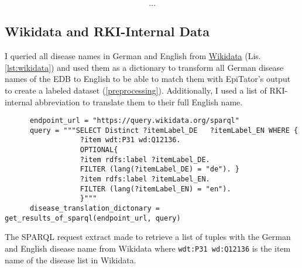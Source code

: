   \[\dots\]



\subsection{Wikidata and RKI-Internal Data}\label{wikidata}
  I queried all disease names in German and English from \href{https://www.wikidata.org/wiki/Wikidata:Main_Page}{Wikidata} (Lis. \ref{lst:wikidata}) and used them as a dictionary to transform all German disease names of the EDB to English to be able to match them with EpiTator's output to create a labeled dataset (\ref{preprocessing}).
  Additionally, I used a list of RKI-internal abbreviation to translate them to their full English name.

  \begin{listing}[h]
    \begin{verbatim}
      endpoint_url = "https://query.wikidata.org/sparql"
      query = """SELECT Distinct ?itemLabel_DE   ?itemLabel_EN WHERE {
                  ?item wdt:P31 wd:Q12136.
                  OPTIONAL{
                  ?item rdfs:label ?itemLabel_DE.
                  FILTER (lang(?itemLabel_DE) = "de"). }
                  ?item rdfs:label ?itemLabel_EN.
                  FILTER (lang(?itemLabel_EN) = "en").
                  }"""
      disease_translation_dictonary = get_results_of_sparql(endpoint_url, query)
    \end{verbatim}
    \caption{The SPARQL request extract made to retrieve a list of tuples with the German and English disease name from Wikidata where \texttt{wdt:P31 wd:Q12136} is the item name of the disease list in Wikidata.}
    \label{lst:wikidata}
  \end{listing}

